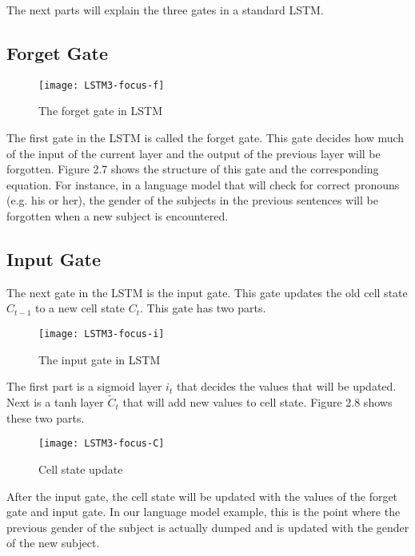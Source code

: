         The next parts will explain the three gates in a standard LSTM.

    \subsection{Forget Gate}
        \begin{figure}[H]
        \centering
        \texttt{[image: LSTM3-focus-f]}
        \caption{The forget gate in LSTM \citep{olah2015understanding}}
        \end{figure}
        The first gate in the LSTM is called the forget gate. This gate decides how much of the input of the current layer and the output of the previous layer will be forgotten. Figure 2.7 shows the structure of this gate and the corresponding equation. For instance, in a language model that will check for correct pronouns (e.g. his or her), the gender of the subjects in the previous sentences will be forgotten when a new subject is encountered.

    \subsection{Input Gate}
        The next gate in the LSTM is the input gate. This gate updates the old cell state \( C_{t-1} \) to a new cell state \( C_t \). This gate has two parts.

        \begin{figure}[H]
        \centering
        \texttt{[image: LSTM3-focus-i]}
        \caption{The input gate in LSTM \citep{olah2015understanding}}
        \end{figure}
        The first part is a sigmoid layer \( i_t \) that decides the values that will be updated. Next is a tanh layer \(\tilde{C}_t\) that will add new values to cell state. Figure 2.8 shows these two parts.

        \begin{figure}[H]
        \centering
        \texttt{[image: LSTM3-focus-C]}
        \caption{Cell state update \citep{olah2015understanding}}
        \end{figure}
        After the input gate, the cell state will be updated with the values of the forget gate and input gate. In our language model example, this is the point where the previous gender of the subject is actually dumped and is updated with the gender of the new subject.

